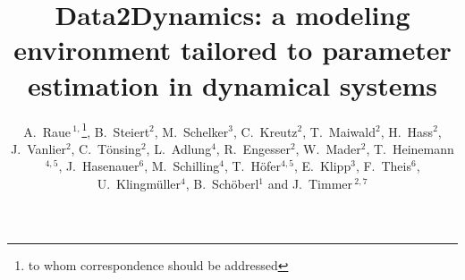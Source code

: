 \documentclass{bioinfo}
\begin{document}

\title[Data2Dynamics]{Data2Dynamics: a modeling environment tailored to parameter 
estimation in dynamical systems}
\author[A.~Raue \textit{et~al.}]{
A.~Raue\,$^{1,}$\footnote{to whom correspondence 
should be addressed}, 
B.~Steiert$^{2}$, 
M.~Schelker$^{3}$, 
C.~Kreutz$^{2}$, 
T.~Maiwald$^{2}$, 
H.~Hass$^{2}$, 
J.~Vanlier$^{2}$, 
C.~T\"onsing$^{2}$, 
L.~Adlung$^{4}$, 
R.~Engesser$^{2}$, 
W.~Mader$^{2}$, 
T.~Heinemann$^{4,5}$, 
J.~Hasenauer$^{6}$, 
M.~Schilling$^{4}$, 
T.~H\"ofer$^{4,5}$, 
E.~Klipp$^{3}$, 
F.~Theis$^{6}$, 
U.~Klingm\"uller$^{4}$,
B.~Sch\"oberl$^{1}$ 
and J.~Timmer\,$^{2,7}$}
\address{$^{1}$Merrimack Pharmaceuticals Inc., 02139 Cambridge, MA, USA\\
$^{2}$University of Freiburg, Institute for Physics, 79104 Freiburg, Germany\\
$^{3}$Humboldt-Universit\"at zu Berlin, Theoretical Biophysics, 10115 Berlin, Germany\\
$^{4}$German Cancer Research Center, 69120 Heidelberg, Germany\\
$^{5}$BioQuant, University of Heidelberg, 69120 Heidelberg, Germany\\
$^{6}$Helmholtz Center Munich, 85764 Neuherberg, Germany\\
$^{7}$BIOSS Centre for Biological Signalling Studies, University of Freiburg, 79104 Freiburg, Germany}



\maketitle
\end{document}
